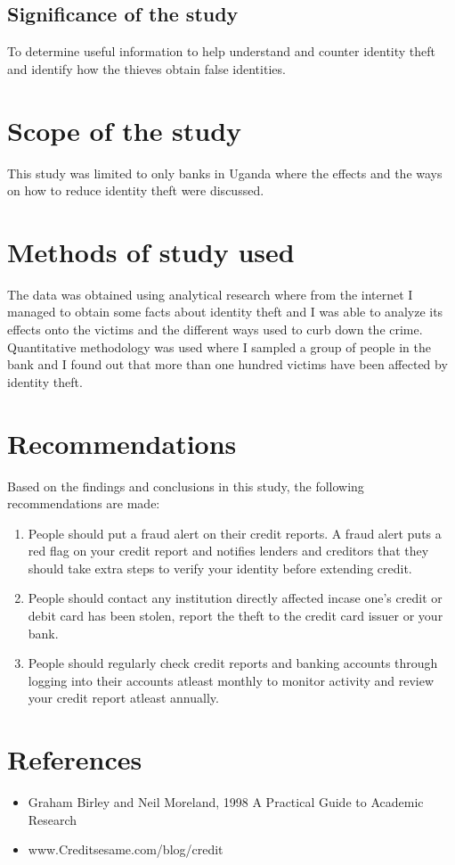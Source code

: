 \documentclass[12pt,]{article}
\begin{document}
\subsection{Significance of the study}
To determine useful information to help understand and counter identity theft and identify how the thieves obtain false identities.
\section{Scope of the study}
This study was limited to only banks in Uganda where the effects and the ways on how to reduce identity theft were discussed.

\section{Methods of study used }
The data was obtained using analytical research where from the internet I managed to obtain some facts about identity theft and I was able to analyze its effects onto the victims and the different ways used to curb down the crime.
Quantitative methodology was used where I sampled a group of people in the bank and I found out that more than one hundred victims have been affected by identity theft.

\section{Recommendations }
Based on the findings and conclusions in this study, the following recommendations are made:

\begin{enumerate}

\item People should put a fraud alert on their credit reports. A fraud alert puts a red flag on your credit report and notifies lenders and creditors that they should take extra steps to verify your identity before extending credit.

\item People should contact any institution directly affected incase one’s credit or debit card has been stolen, report the theft to the credit card issuer or your bank.

\item People should regularly check credit reports and banking accounts through logging into their accounts atleast monthly to monitor activity and review your credit report atleast annually.
\end{enumerate}
\section{References}
\begin{itemize}
\item Graham Birley and Neil Moreland, 1998 A Practical Guide to Academic Research 
\item www.Creditsesame.com/blog/credit
\end{itemize}
\end{document}
